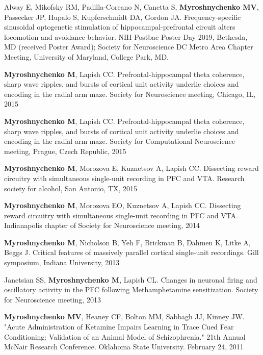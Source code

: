 \documentclass[10pt]{article}
\makeatletter
\newlength{\bibhang}
\newlength{\bibsep}
 {\@listi \global\bibsep\itemsep \global\advance\bibsep by\parsep}
\newenvironment{bibsection}%
        {\vspace{-\baselineskip}\begin{list}{}{%
       \setlength{\leftmargin}{\bibhang}%
       \setlength{\itemindent}{-\leftmargin}%
       \setlength{\itemsep}{\bibsep}%
       \setlength{\parsep}{\z@}%
        \setlength{\partopsep}{0pt}%
        \setlength{\topsep}{0pt}}}
        {\end{list}\vspace{-.6\baselineskip}}
\makeatother
\begin{document}
\begin{bibsection}
\item Alway E, Mikofsky RM, Padilla-Coreano N, Canetta S, {\bf Myroshnychenko MV},\\ Passecker JP, Hupalo S, Kupferschmidt DA, Gordon JA.
 Frequency-specific sinusoidal optogenetic stimulation of hippocampal-prefrontal circuit alters locomotion and avoidance behavior. NIH Postbac Poster Day 2019, Bethesda, MD (received Poster Award);
Society for Neuroscience DC Metro Area Chapter Meeting, University of Maryland, College Park, MD.

\item {\bf Myroshnychenko M}, Lapish CC. Prefrontal-hippocampal theta coherence, sharp wave ripples, and bursts of cortical unit activity underlie choices and encoding in the radial arm maze. Society for Neuroscience meeting, Chicago, IL, 2015

\item {\bf Myroshnychenko M}, Lapish CC. Prefrontal-hippocampal theta coherence, sharp wave ripples, and bursts of cortical unit activity underlie choices and encoding in the radial arm maze. Society for Computational Neuroscience meeting, Prague, Czech Republic, 2015

\item {\bf Myroshnychenko M}, Morozova E, Kuznetsov A, Lapish CC. Dissecting reward circuitry with simultaneous single-unit recording in PFC and VTA. Research society for alcohol, San Antonio, TX, 2015

\item {\bf Myroshnychenko M}, Morozova EO, Kuznetsov A, Lapish CC. Dissecting reward circuitry with simultaneous single-unit recording in PFC and VTA. Indianapolis chapter of Society for Neuroscience meeting, 2014

\item {\bf Myroshnychenko M}, Nicholson B, Yeh F, Brickman B, Dahmen K, Litke A, Beggs J. Critical features of massively parallel cortical single-unit recordings. Gill symposium, Indiana University, 2013


\item Janetsian SS, {\bf Myroshnychenko M}, Lapish CL. Changes in neuronal firing and oscillatory activity in the PFC following Methamphetamine sensitization. Society for Neuroscience meeting, 2013

\item {\bf Myroshnychenko MV}, Heaney CF, Bolton MM, Sabbagh JJ, Kinney JW. "Acute Administration of Ketamine Impairs Learning in
	Trace Cued Fear Conditioning: Validation of an Animal Model
	of Schizophrenia."  21th Annual McNair Research Conference. Oklahoma State University. February 24, 2011


\end{bibsection}
\end{document}
